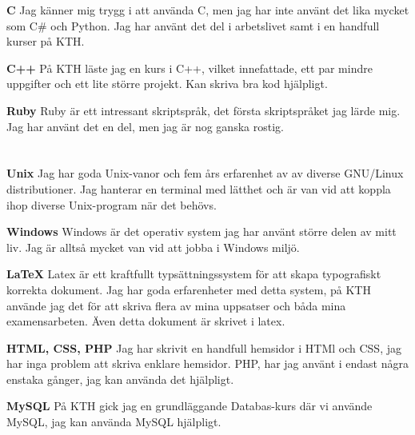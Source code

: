 \documentclass[margin,line]{resume}%
\begin{document}
\begin{resume}
		\textbf{C}\hspace{0.5cm}
		Jag känner mig trygg i att använda C, men jag har inte använt det lika mycket som
		C\# och Python. Jag har använt det del i arbetslivet samt i en handfull kurser på KTH.

		\textbf{C++}\hspace{0.5cm}
		På KTH läste jag en kurs i C++, vilket innefattade, ett par mindre
		uppgifter och ett lite större projekt. Kan skriva bra kod hjälpligt.

		\textbf{Ruby}\hspace{0.5cm}
		Ruby är ett intressant skriptspråk, det första skriptspråket jag lärde
		mig. Jag har använt det en del, men jag är nog ganska rostig.

\newpage
	   \section{}\vspace{0.001mm}

		\textbf{Unix}\hspace{0.5cm}
		Jag har goda Unix-vanor och fem års erfarenhet av av diverse GNU/Linux
		distributioner. Jag hanterar en terminal med lätthet och är van
		vid att koppla ihop diverse Unix-program när det behövs.

		\textbf{Windows}\hspace{0.5cm}
		Windows är det operativ system jag har använt större delen av mitt liv.
		Jag är alltså mycket van vid att jobba i Windows miljö.

		\textbf{\LaTeX}\hspace{0.5cm}
		Latex är ett kraftfullt typsättningssystem för att skapa typografiskt
		korrekta dokument. Jag har goda erfarenheter med detta system, på KTH
		använde jag det för att skriva flera av mina uppsatser och båda mina
		examensarbeten. Även detta dokument är skrivet i latex.

		\textbf{HTML, CSS, PHP}\hspace{0.5cm}
		Jag har skrivit en handfull hemsidor i HTMl och CSS, jag har inga
		problem att skriva enklare hemsidor. PHP, har jag använt i endast
		några enstaka gånger, jag kan använda det hjälpligt.

		\textbf{MySQL}\hspace{0.5cm}
		På KTH gick jag en grundläggande Databas-kurs där vi använde MySQL,
		jag kan använda MySQL hjälpligt.


\end{resume}
\end{document}
